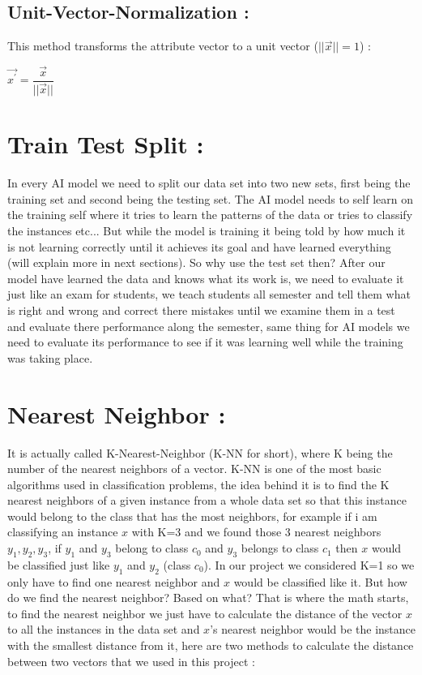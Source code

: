 \documentclass[10pt,a4paper]{article}
\begin{document}
\subsection{Unit-Vector-Normalization :}
This method transforms the attribute vector to a unit vector ($ ||\vec{x}|| = 1 $) :\\
\begin{center}
$ \vec{x^{\prime}} = \dfrac{\vec{x}}{||\vec{x}||} $
\end{center}

\section{Train Test Split :}
In every AI model we need to split our data set into two new sets, first being the training set and second being the testing set. The AI model needs to self learn on the training self where it tries to learn the patterns of the data or tries to classify the instances etc... But while the model is training it being told by how much it is not learning correctly until it achieves its goal and have learned everything (will explain more in next sections). So why use the test set then? After our model have learned the data and knows what its work is, we need to evaluate it just like an exam for students, we teach students all semester and tell them what is right and wrong and correct there mistakes until we examine them in a test and evaluate there performance along the semester, same thing for AI models we need to evaluate its performance to see if it was learning well while the training was taking place.

\section{Nearest Neighbor :}
\large It is actually called K-Nearest-Neighbor (K-NN for short), where K being the number of the nearest neighbors of a vector. K-NN is one of the most basic algorithms used in classification problems, the idea behind it is to find the K nearest neighbors of a given instance from a whole data set so that this instance would belong to the class that has the most neighbors, for example if i am classifying an instance $ x $ with K=3 and we found those 3 nearest neighbors $ y_1,y_2,y_3 $, if $ y_1 $ and $ y_3 $ belong to class $ c_0 $ and $ y_3 $ belongs to class $ c_1 $ then $ x $ would be classified just like $ y_1 $ and $ y_2 $ (class $ c_0 $). In our project we considered K=1 so we only have to find one nearest neighbor and $ x $ would be classified like it. But how do we find the nearest neighbor? Based on what? That is where the math starts, to find the nearest neighbor we just have to calculate the distance of the vector $ x $ to all the instances in the data set and $ x $'s nearest neighbor would be the instance with the smallest distance from it, here are two methods to calculate the distance between two vectors that we used in this project :\\
\end{document}
